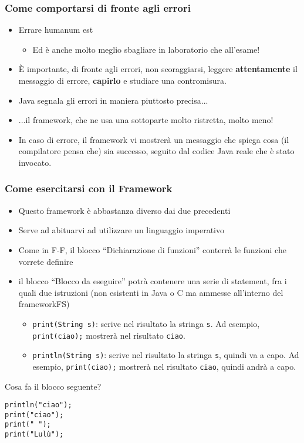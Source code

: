 \documentclass{beamer}
\begin{document}
\begin{frame}[fragile]
\frametitle{Come comportarsi di fronte agli errori}
\begin{itemize}
 \item Errare humanum est
  \begin{itemize}
    \item Ed è anche molto meglio sbagliare in laboratorio che all'esame!
  \end{itemize}
 \item È importante, di fronte agli errori, non scoraggiarsi, leggere \textbf{attentamente} il messaggio di errore, \textbf{capirlo} e studiare una contromisura.
 \item Java segnala gli errori in maniera piuttosto precisa...
 \item ...il framework, che ne usa una sottoparte molto ristretta, molto meno!
 \item In caso di errore, il framework vi mostrerà un messaggio che spiega cosa (il compilatore pensa che) sia successo, seguito dal codice Java reale che è stato invocato.
\end{itemize}
\end{frame}

\begin{frame}[fragile]
\frametitle{Come esercitarsi con il Framework}
\begin{itemize}
 \item Questo framework è abbastanza diverso dai due precedenti
 \item Serve ad abituarvi ad utilizzare un linguaggio imperativo
 \item Come in F-F, il blocco ``Dichiarazione di funzioni'' conterrà le funzioni che vorrete definire
 \item il blocco ``Blocco da eseguire'' potrà contenere una serie di statement, fra i quali due istruzioni (non esistenti in Java o C ma ammesse all'interno del frameworkFS)
  \begin{itemize}
    \item \texttt{print(String s)}: scrive nel risultato la stringa \texttt{s}. Ad esempio, \texttt{print(\textquotedbl{}ciao\textquotedbl{});} mostrerà nel risultato \texttt{ciao}.
    \item \texttt{println(String s)}: scrive nel risultato la stringa \texttt{s}, quindi va a capo. Ad esempio, \texttt{print(\textquotedbl{}ciao\textquotedbl{});} mostrerà nel risultato \texttt{ciao}, quindi andrà a capo.
  \end{itemize}
\end{itemize}
Cosa fa il blocco seguente?
\begin{verbatim}
println("ciao");
print("ciao");
print(" ");
print("Lulù");
\end{verbatim}
\end{frame}
\end{document}
